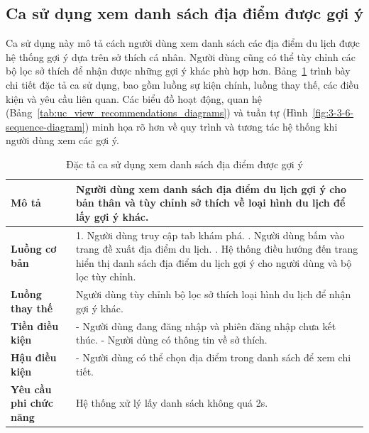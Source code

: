 \subsection{Ca sử dụng xem danh sách địa điểm được gợi ý}
\noindent Ca sử dụng này mô tả cách người dùng xem danh sách các địa điểm du lịch được hệ thống gợi ý dựa trên sở thích cá nhân. Người dùng cũng có thể tùy chỉnh các bộ lọc sở thích để nhận được những gợi ý khác phù hợp hơn. Bảng~\ref{tab:uc_view_recommendations_spec} trình bày chi tiết đặc tả ca sử dụng, bao gồm luồng sự kiện chính, luồng thay thế, các điều kiện và yêu cầu liên quan. Các biểu đồ hoạt động, quan hệ (Bảng~\ref{tab:uc_view_recommendations_diagrams}) và tuần tự (Hình~\ref{fig:3-3-6-sequence-diagram}) minh họa rõ hơn về quy trình và tương tác hệ thống khi người dùng xem các gợi ý.

\begin{longtable}{| p{4cm} | p{\dimexpr\linewidth-4cm-4\tabcolsep} |} %
    \caption{Đặc tả ca sử dụng xem danh sách địa điểm được gợi ý} %
    \label{tab:uc_view_recommendations_spec} \\ %

    \hline
    \textbf{Mô tả} & Người dùng xem danh sách địa điểm du lịch gợi ý cho bản thân và tùy chỉnh sở thích về loại hình du lịch để lấy gợi ý khác. \\
    \hline
    \endfirsthead %



    \hline %
    \endlastfoot

    \textbf{Luồng cơ bản} & 1. Người dùng truy cập tab khám phá. \newline
                           2. Người dùng bấm vào trang đề xuất địa điểm du lịch. \newline
                           3. Hệ thống điều hướng đến trang hiển thị danh sách địa điểm du lịch gợi ý cho người dùng và bộ lọc tùy chỉnh. \\
    \hline
    \textbf{Luồng thay thế} & Người dùng tùy chỉnh bộ lọc sở thích loại hình du lịch để nhận gợi ý khác. \\
    \hline
    \textbf{Tiền điều kiện} & - Người dùng đang đăng nhập và phiên đăng nhập chưa kết thúc. \newline
                             - Người dùng có thông tin về sở thích. \\
    \hline
    \textbf{Hậu điều kiện} & - Người dùng có thể chọn địa điểm trong danh sách để xem chi tiết. \\
    \hline
    \textbf{Yêu cầu phi chức năng} & Hệ thống xử lý lấy danh sách không quá 2s. \\

\end{longtable}
\vspace{0.8cm}

